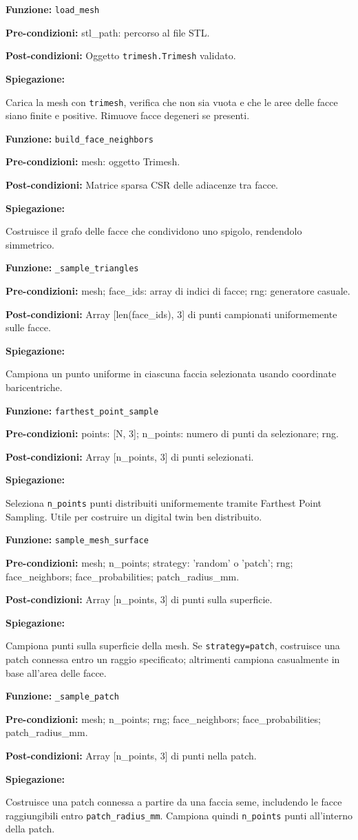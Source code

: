 \documentclass[11pt,a4paper]{article}
\newenvironment{functionspec}[3]{%
    \par\medskip\noindent
    \textbf{Funzione:} \texttt{#1}\par
    \textbf{Pre-condizioni:} #2\par
    \textbf{Post-condizioni:} #3\par
    \textbf{Spiegazione:}\par\noindent\ignorespaces
}{%
    \par\medskip
}
\begin{document}
\begin{functionspec}{load\_mesh}{stl\_path: percorso al file STL.}{Oggetto \texttt{trimesh.Trimesh} validato.}
Carica la mesh con \texttt{trimesh}, verifica che non sia vuota e che le aree delle facce siano finite e positive. Rimuove facce degeneri se presenti.
\end{functionspec}

\begin{functionspec}{build\_face\_neighbors}{mesh: oggetto Trimesh.}{Matrice sparsa CSR delle adiacenze tra facce.}
Costruisce il grafo delle facce che condividono uno spigolo, rendendolo simmetrico.
\end{functionspec}

\begin{functionspec}{\_sample\_triangles}{mesh; face\_ids: array di indici di facce; rng: generatore casuale.}{Array [len(face\_ids), 3] di punti campionati uniformemente sulle facce.}
Campiona un punto uniforme in ciascuna faccia selezionata usando coordinate baricentriche.
\end{functionspec}

\begin{functionspec}{farthest\_point\_sample}{points: [N, 3]; n\_points: numero di punti da selezionare; rng.}{Array [n\_points, 3] di punti selezionati.}
Seleziona \texttt{n\_points} punti distribuiti uniformemente tramite Farthest Point Sampling. Utile per costruire un digital twin ben distribuito.
\end{functionspec}

\begin{functionspec}{sample\_mesh\_surface}{mesh; n\_points; strategy: 'random' o 'patch'; rng; face\_neighbors; face\_probabilities; patch\_radius\_mm.}{Array [n\_points, 3] di punti sulla superficie.}
Campiona punti sulla superficie della mesh. Se \texttt{strategy=patch}, costruisce una patch connessa entro un raggio specificato; altrimenti campiona casualmente in base all'area delle facce.
\end{functionspec}

\begin{functionspec}{\_sample\_patch}{mesh; n\_points; rng; face\_neighbors; face\_probabilities; patch\_radius\_mm.}{Array [n\_points, 3] di punti nella patch.}
Costruisce una patch connessa a partire da una faccia seme, includendo le facce raggiungibili entro \texttt{patch\_radius\_mm}. Campiona quindi \texttt{n\_points} punti all'interno della patch.
\end{functionspec}
\end{document}

